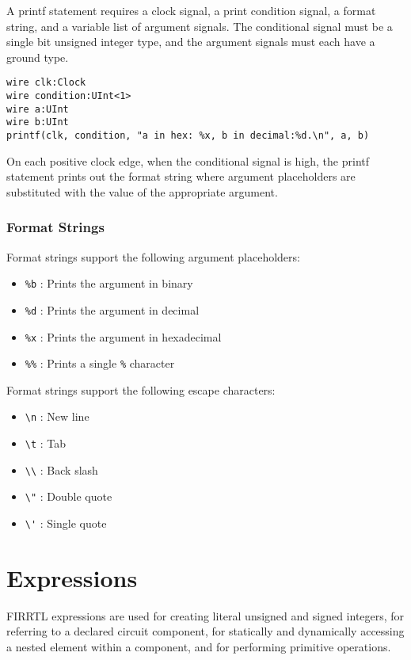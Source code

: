 \documentclass[12pt]{article}
\begin{document}
A printf statement requires a clock signal, a print condition signal, a format string, and a variable list of argument signals. The conditional signal must be a single bit unsigned integer type, and the argument signals must each have a ground type.

\begin{verbatim}
wire clk:Clock
wire condition:UInt<1>
wire a:UInt
wire b:UInt
printf(clk, condition, "a in hex: %x, b in decimal:%d.\n", a, b)
\end{verbatim}

On each positive clock edge, when the conditional signal is high, the printf statement prints out the format string where argument placeholders are substituted with the value of the appropriate argument.

\subsubsection{Format Strings}

Format strings support the following argument placeholders:
\begin{itemize}
\item \verb|%b| : Prints the argument in binary
\item \verb|%d| : Prints the argument in decimal
\item \verb|%x| : Prints the argument in hexadecimal
\item \verb|%%| : Prints a single \verb|%| character
\end{itemize}

Format strings support the following escape characters:
\begin{itemize}
\item \verb|\n| : New line
\item \verb|\t| : Tab
\item \verb|\\| : Back slash
\item \verb|\"| : Double quote
\item \verb|\'| : Single quote
\end{itemize}

\section{Expressions}

FIRRTL expressions are used for creating literal unsigned and signed integers, for referring to a declared circuit component, for statically and dynamically accessing a nested element within a component, and for performing primitive operations. 
\end{document}

